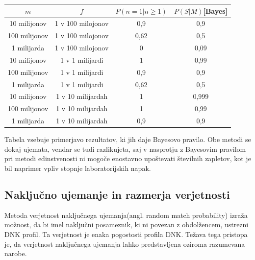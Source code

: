 \documentclass[12pt,a4paper]{amsart}
\theoremstyle{definition} %
\theoremstyle{plain} %
\begin{document}
\begin{table}[h!]
    \centering
    \begin{tabular}{c c c c} 
    \hline
    $m$ & $f$ & $P(n = 1 \lvert n \ge 1)$ & $P(S \lvert M)$[Bayes]\\ 
    \hline
    10 milijonov & 1 v 100 milojonov & 0,9 & 0,9 \\
    100 milijonov & 1 v 100 milojonov & 0,62 & 0,5 \\
    1 milijarda & 1 v 100 milojonov & 0 & 0,09 \\ \hline
    10 milijonov & 1 v 1 milijardi & 1 & 0,99 \\
    100 milijonov & 1 v 1 milijardi & 0,9 & 0,9 \\
    1 milijarda & 1 v 1 milijardi & 0,62 & 0,5 \\ \hline
    10 milijonov & 1 v 10 milijardah & 1 & 0,999 \\
    100 milijonov & 1 v 10 milijardah & 1 & 0,99 \\
    1 milijarda & 1 v 10 milijardah & 0,9 & 0,9 \\ \hline
\end{tabular}
\end{table}

Tabela vsebuje primerjavo rezultatov, ki jih daje Bayesovo pravilo. Obe metodi se dokaj ujemata, vendar se tudi razlikujeta, saj v nasprotju 
z Bayesovim pravilom pri metodi edinstvenosti ni mogoče enostavno upoštevati številnih zapletov, kot je bil naprimer vpliv stopnje laboratorijskih napak. \\

\subsection{Naključno ujemanje in razmerja verjetnosti}
Metoda verjetnost naključnega ujemanja(angl. random match probability) izraža možnost, da bi imel naključni posameznik, ki ni povezan z obdolžencem, 
ustrezni DNK profil. Ta verjetnost je enaka pogostosti profila DNK. Težava tega pristopa je, da verjetnost naključnega ujemanja lahko predstavljena 
oziroma razumevana narobe. \\
\end{document}
